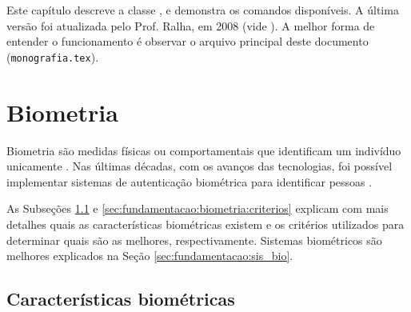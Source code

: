 \newcommand{\texCommand}[1]{\texttt{\textbackslash{#1}}}%

\newcommand{\exemplo}[1]{%
\vspace{\baselineskip}%
\noindent\fbox{\begin{minipage}{\textwidth}#1\end{minipage}}%
\\\vspace{\baselineskip}}%

\newcommand{\exemploVerbatim}[1]{%
\vspace{\baselineskip}%
\noindent\fbox{\begin{minipage}{\textwidth}%
#1\end{minipage}}%
\\\vspace{\baselineskip}}%


Este capítulo descreve a classe \unbcic, e demonstra os comandos disponíveis. A
última versão foi atualizada pelo Prof. Ralha, em 2008 (vide ).
A melhor forma de entender o funcionamento é observar o arquivo principal deste
documento (\texttt{monografia.tex}).

\section{Biometria} \label{sec:fundamentacao:biometria}

\par Biometria são medidas físicas ou comportamentais que identificam um indivíduo unicamente \cite{li2009encyclopedia}. Nas últimas décadas, com os avanços das tecnologias, foi possível implementar sistemas de autenticação biométrica para identificar pessoas \cite{wayman2005biometric}. 

\par As Subseções \ref{sec:fundamentacao:biometria:caracteristicas} e \ref{sec:fundamentacao:biometria:criterios} explicam com mais detalhes quais as características biométricas existem e os critérios utilizados para determinar quais são as melhores, respectivamente. Sistemas biométricos são melhores explicados na Seção \ref{sec:fundamentacao:sis_bio}.

\subsection{Características biométricas}\label{sec:fundamentacao:biometria:caracteristicas}

